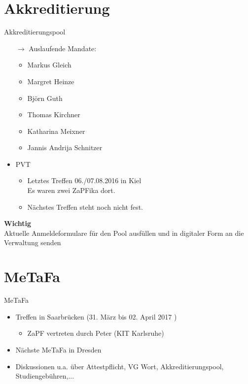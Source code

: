 \documentclass[compress, aspectratio=169]{beamer}
\begin{document}
\section{Akkreditierung}

\begin{frame}{Akkreditierungspool}
  \begin{itemize}
    \item[$\rightarrow$] Auslaufende Mandate:
      \begin{itemize}
      \item Markus Gleich
      \item Margret Heinze
      \item Björn Guth
      \item Thomas Kirchner
      \item Katharina Meixner
      \item Jannis Andrija Schnitzer
      \end{itemize}
    \item PVT
      \begin{itemize}
      \item Letztes Treffen 06./07.08.2016 in Kiel\\
        Es waren zwei ZaPFika dort.
      \item Nächstes Treffen steht noch nicht fest.
      \end{itemize}
    \end{itemize}
\end{frame}

\begin{frame}
  \begin{framed}
    \begin{center}
      {\Huge \textbf{Wichtig}}\\
      \vspace{0.5cm}
      {\Large Aktuelle Anmeldeformulare für den Pool ausfüllen und in digitaler Form an die Verwaltung senden}
      \end{center}
      \end{framed}
\end{frame}

\section{MeTaFa}

\begin{frame}{MeTaFa}
  \begin{itemize}
  \item Treffen in Saarbrücken (31. März bis 02. April 2017 )
    \begin{itemize}
    \item ZaPF vertreten durch Peter (KIT Karlsruhe)
    \end{itemize}
  \item Nächste MeTaFa in Dresden
  \item Diskussionen u.a. über Attestpflicht, VG Wort, Akkreditierungspool, Studiengebühren,...
  \end{itemize}
\end{frame}
\end{document}
